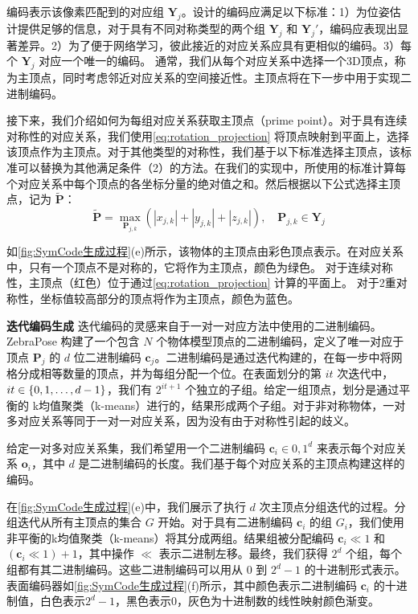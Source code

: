 编码表示该像素匹配到的对应组 $\mathbf{Y}_j$。设计的编码应满足以下标准：1）为位姿估计提供足够的信息，对于具有不同对称类型的两个组 $\mathbf{Y}_j$ 和 $\mathbf{Y}_j'$，编码应表现出显著差异。2）为了便于网络学习，彼此接近的对应关系应具有更相似的编码。3）每个 $\mathbf{Y}_j$ 对应一个唯一的编码。
通常，我们从每个对应关系中选择一个3D顶点，称为主顶点，同时考虑邻近对应关系的空间接近性。主顶点将在下一步中用于实现二进制编码。

接下来，我们介绍如何为每组对应关系获取主顶点（prime point）。对于具有连续对称性的对应关系，我们使用\autoref{eq:rotation_projection} 将顶点映射到平面上，选择该顶点作为主顶点。对于其他类型的对称性，我们基于以下标准选择主顶点，该标准可以替换为其他满足条件（2）的方法。在我们的实现中，所使用的标准计算每个对应关系中每个顶点的各坐标分量的绝对值之和。然后根据以下公式选择主顶点，记为 $\tilde{\mathbf{P}}$：
\begin{equation}
    \tilde{\mathbf{P}} = \max_{\mathbf{P}_{j,k}}
    (\left | x_{j,k} \right | +\left | y_{j,k} \right | +\left | z_{j,k} \right |), \quad \mathbf{P}_{j,k} \in \mathbf{Y}_j
\end{equation}

如\autoref{fig:SymCode生成过程}(e)所示，该物体的主顶点由彩色顶点表示。在对应关系中，只有一个顶点不是对称的，它将作为主顶点，颜色为绿色。
对于连续对称性，主顶点（红色）位于通过\autoref{eq:rotation_projection} 计算的平面上。
对于2重对称性，坐标值较高部分的顶点将作为主顶点，颜色为蓝色。

\textbf{迭代编码生成 } 迭代编码的灵感来自于一对一对应方法中使用的二进制编码\cite{su2022zebrapose}。ZebraPose\cite{su2022zebrapose} 构建了一个包含 $N$ 个物体模型顶点的二进制编码，定义了唯一对应于顶点 $\mathbf{P}_j$ 的 $d$ 位二进制编码 $\mathbf{c}_{j}$。二进制编码是通过迭代构建的，在每一步中将网格分成相等数量的顶点，并为每组分配一个位。在表面划分的第 $it$ 次迭代中，$it \in \{0, 1, \text{\textellipsis}, d-1\}$，我们有 $2^{it+1}$ 个独立的子组。给定一组顶点，划分是通过平衡的 k均值聚类（k-means）进行的，结果形成两个子组。对于非对称物体，一对多对应关系等同于一对一对应关系，因为没有由于对称性引起的歧义。

给定一对多对应关系集，我们希望用一个二进制编码 $\mathbf{c}_i \in {0, 1}^d$ 来表示每个对应关系 $\mathbf{o}_i$，其中 $d$ 是二进制编码的长度。我们基于每个对应关系的主顶点构建这样的编码。

在\autoref{fig:SymCode生成过程}(e)中，我们展示了执行 $d$ 次主顶点分组迭代的过程。分组迭代从所有主顶点的集合 $G$ 开始。对于具有二进制编码 $\mathbf{c}_i$ 的组 $G_{i}$，我们使用非平衡的k均值聚类（k-means）将其分成两组。结果组被分配编码 $\mathbf{c}_i \ll 1$ 和 $(\mathbf{c}_i \ll 1) + 1$，其中操作 $\ll$ 表示二进制左移。最终，我们获得 $2^d$ 个组，每个组都有其二进制编码。这些二进制编码可以用从 $0$ 到 $2^d - 1$ 的十进制形式表示。表面编码器如\autoref{fig:SymCode生成过程}(f)所示，其中颜色表示二进制编码 $\mathbf{c}_i$ 的十进制值，白色表示$2^d - 1$，黑色表示$0$，灰色为十进制数的线性映射颜色渐变。


